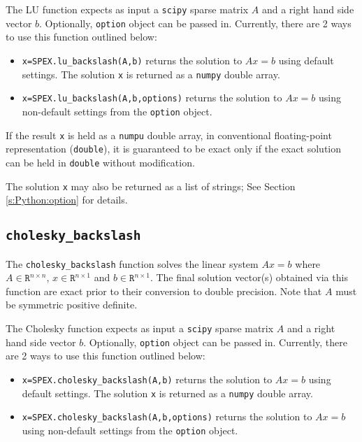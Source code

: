 \documentclass[12pt,oneside]{book}
\theoremstyle{definition}
\begin{document}
The LU function expects as input a \verb|scipy| sparse matrix $A$ and a right hand side vector $b$. Optionally, \verb|option| object can be passed in.
Currently, there are 2 ways to use this function outlined below:

\begin{itemize}
    \item \verb|x=SPEX.lu_backslash(A,b)| returns the solution to $A x = b$ using default settings. The solution \verb|x| is returned as a \verb|numpy| double array.
    \item \verb|x=SPEX.lu_backslash(A,b,options)| returns the solution to $A x = b$ using non-default settings from the \verb|option| object.
\end{itemize}

If the result \verb|x| is held as a \verb|numpu| double array, in conventional floating-point representation (\verb|double|), it is guaranteed to be exact only if the exact solution can be held in \verb|double| without modification.

The solution \verb|x| may also be returned as a list of strings; See Section \ref{s:Python:option} for details.


\subsection{\texttt{cholesky\_backslash}}
The \verb|cholesky_backslash| function solves the linear system $Ax=b$ where$A \in \mathtt{R}^{n \times n}$, $x \in \mathtt{R}^{n \times 1}$ and $b \in \mathtt{R}^{n \times 1}$. The final solution vector(s) obtained via this function are exact prior to their conversion to double precision. Note that $A$ must be symmetric positive definite.

The Cholesky function expects as input a \verb|scipy| sparse matrix $A$ and a right hand side vector $b$. Optionally, \verb|option| object can be passed in.
Currently, there are 2 ways to use this function outlined below:

\begin{itemize}
    \item \verb|x=SPEX.cholesky_backslash(A,b)| returns the solution to $A x = b$ using default settings. The solution \verb|x| is returned as a \verb|numpy| double array.
    \item \verb|x=SPEX.cholesky_backslash(A,b,options)| returns the solution to $A x = b$ using non-default settings from the \verb|option| object.
\end{itemize}
\end{document}

